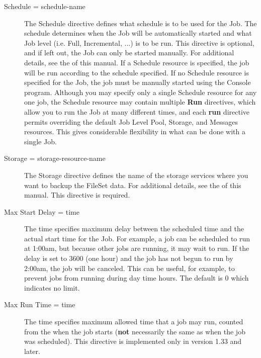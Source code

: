 \begin{description}
\item [Schedule = \lt{}schedule-name\gt{}]
   The Schedule directive defines  what schedule is to be used for the Job. The
   schedule determines  when the Job will be automatically started and what Job
   level (i.e.  Full, Incremental, ...) is to be run. This directive is optional,
   and  if left out, the Job can only be started manually. For additional 
   details, see the 
    of this
   manual.  If a Schedule resource is specified, the job will be run according to
   the schedule specified. If no Schedule resource is specified for the  Job,
   the job must be manually started using the Console program.  Although you may
   specify only a single Schedule resource for any one  job, the Schedule
   resource may contain multiple {\bf Run} directives,  which allow you to run
   the Job at many different times, and each  {\bf run} directive permits
   overriding the default Job Level Pool,  Storage, and Messages resources. This
   gives considerable flexibility  in what can be done with a single Job. 

\item [Storage = \lt{}storage-resource-name\gt{}]
   The Storage directive  defines the name of the storage services where you want
   to backup  the FileSet data. For additional details, see the 
    of this manual.
    This directive is required.  

\item [Max Start Delay = \lt{}time\gt{}]
   The time specifies  maximum delay between the scheduled time and the actual
   start  time for the Job. For example, a job can be scheduled to run  at
   1:00am, but because other jobs are running, it may wait  to run. If the delay
   is set to 3600 (one hour) and the job  has not begun to run by 2:00am, the job
   will be canceled.  This can be useful, for example, to prevent jobs from
   running  during day time hours. The default is 0 which indicates  no limit. 

\item [Max Run Time = \lt{}time\gt{}]
   The time specifies  maximum allowed time that a job may run, counted from the
   when  the job starts ({\bf not} necessarily the same as when the job  was
   scheduled). This directive is implemented only in version 1.33  and later. 


\end{description}
